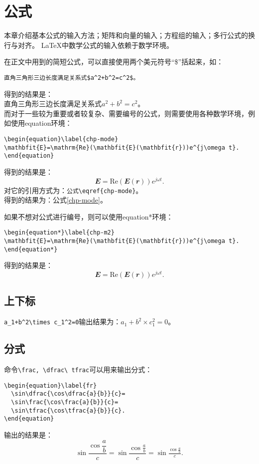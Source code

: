 \chapter{公式}
\label{chap:equ}
本章介绍基本公式的输入方法；矩阵和向量的输入；方程组的输入；多行公式的换行与对齐。
\LaTeX 中数学公式的输入依赖于数学环境。

在正文中用到的简短公式，可以直接使用两个美元符号“\$”括起来，如：
\begin{verbatim}
直角三角形三边长度满足关系式$a^2+b^2=c^2$。
\end{verbatim}
得到的结果是：\\
直角三角形三边长度满足关系式$a^2+b^2=c^2$。\\

而对于一些较为重要或者较复杂、需要编号的公式，则需要使用各种数学环境，例如使用equation环境：
\begin{verbatim}
\begin{equation}\label{chp-mode}
\mathbfit{E}=\mathrm{Re}(\mathbfit{E}(\mathbfit{r}))e^{j\omega t}.
\end{equation}
\end{verbatim}
得到的结果是：
\begin{equation}\label{chp-mode}
\mathbfit{E}=\mathrm{Re}(\mathbfit{E}(\mathbfit{r}))e^{j\omega t}.
\end{equation}
对它的引用方式为：\verb|公式\eqref{chp-mode}|。\\
得到的结果为：公式\eqref{chp-mode}。

如果不想对公式进行编号，则可以使用equation*环境：
\begin{verbatim}
\begin{equation*}\label{chp-m2}
\mathbfit{E}=\mathrm{Re}(\mathbfit{E}(\mathbfit{r}))e^{j\omega t}.
\end{equation*}
\end{verbatim}
得到的结果是：
\begin{equation*}\label{chp-m2}
\mathbfit{E}=\mathrm{Re}(\mathbfit{E}(\mathbfit{r}))e^{j\omega t}.
\end{equation*}

\section{上下标}\label{section4-1}
\verb|a_1+b^2\times c_1^2=0|输出结果为：$a_1+b^2\times c_1^2=0$。

\section{分式}\label{section4-2}
命令\verb|\frac, \dfrac\ tfrac|可以用来输出分式：
\begin{verbatim}
\begin{equation}\label{fr}
  \sin\dfrac{\cos\dfrac{a}{b}}{c}=
  \sin\frac{\cos\frac{a}{b}}{c}=
  \sin\tfrac{\cos\tfrac{a}{b}}{c}.
\end{equation}
\end{verbatim}
输出的结果是：
\begin{equation}\label{fr}
\sin\dfrac{\cos\dfrac{a}{b}}{c}=
\sin\frac{\cos\frac{a}{b}}{c}=
\sin\tfrac{\cos\tfrac{a}{b}}{c}.
\end{equation}

